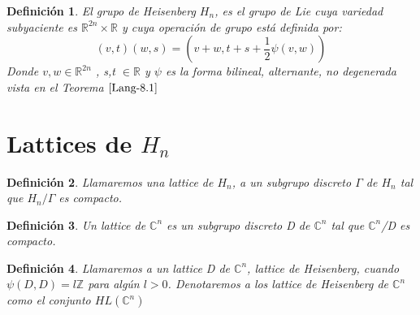 \documentclass[12pt]{article}
\newtheorem{definition}{Definición}
\begin{document}
\begin{definition}
 El grupo de Heisenberg $H_n$, es el grupo de Lie cuya variedad subyaciente es $\mathbb{R}^{2n} \times \mathbb{R}$ y 
 cuya operación de grupo está definida por: 
 $$(v,t)(w,s)=(v+w,t+s + \frac{1}{2} \psi(v,w))$$
 Donde $v,w \in \mathbb{R}^{2n}$ , s,t $\in \mathbb{R}$ y $\psi$ es la forma bilineal, alternante, no degenerada vista en 
 el Teorema $\ref{Lang-8.1}$
\end{definition}


\section{Lattices de $H_n$}

\begin{definition}
 Llamaremos una lattice de $H_n$, a un subgrupo discreto $\Gamma$ de $H_n$ tal que $H_n/\Gamma$ es compacto.
\end{definition}

\begin{definition}
 Un lattice de $\mathbb{C}^n$ es un subgrupo discreto D de $\mathbb{C}^n$ tal que $\mathbb{C}^n$/D es compacto.
\end{definition}


\begin{definition}
 Llamaremos a un lattice D de $\mathbb{C}^n$, lattice de Heisenberg, cuando $\psi(D,D)=l \mathbb{Z} $ para algún $l > 0$.
 Denotaremos a los lattice de Heisenberg de $\mathbb{C}^n$ como el conjunto $HL(\mathbb{C}^n)$
\end{definition}
\end{document}
